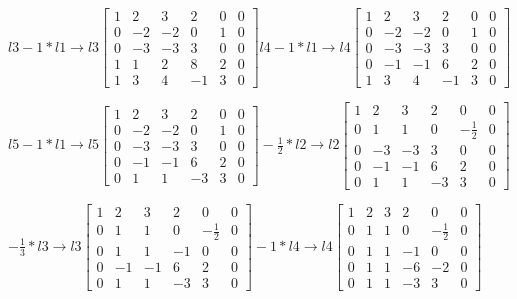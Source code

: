 \documentclass[10pt]{article}
\begin{document}
$l3 - 1 * l1 \rightarrow l3 \left[\begin{array}{ccccc|c}1 & 2 & 3 & 2 & 0 & 0 \\ 0 & -2 & -2 & 0 & 1 & 0 \\ 0 & -3 & -3 & 3 & 0 & 0 \\ 1 & 1 & 2 & 8 & 2 & 0 \\ 1 & 3 & 4 & -1 & 3 & 0\end{array}\right] l4 - 1 * l1 \rightarrow l4 \left[\begin{array}{ccccc|c}1 & 2 & 3 & 2 & 0 & 0 \\ 0 & -2 & -2 & 0 & 1 & 0 \\ 0 & -3 & -3 & 3 & 0 & 0 \\ 0 & -1 & -1 & 6 & 2 & 0 \\ 1 & 3 & 4 & -1 & 3 & 0\end{array}\right]$

$l5 - 1 * l1 \rightarrow l5 \left[\begin{array}{ccccc|c}1 & 2 & 3 & 2 & 0 & 0 \\ 0 & -2 & -2 & 0 & 1 & 0 \\ 0 & -3 & -3 & 3 & 0 & 0 \\ 0 & -1 & -1 & 6 & 2 & 0 \\ 0 & 1 & 1 & -3 & 3 & 0\end{array}\right] -\frac{1}{2} * l2 \rightarrow l2 \left[\begin{array}{ccccc|c}1 & 2 & 3 & 2 & 0 & 0 \\ 0 & 1 & 1 & 0 & -\frac{1}{2} & 0 \\ 0 & -3 & -3 & 3 & 0 & 0 \\ 0 & -1 & -1 & 6 & 2 & 0 \\ 0 & 1 & 1 & -3 & 3 & 0\end{array}\right]$

$-\frac{1}{3} * l3 \rightarrow l3 \left[\begin{array}{ccccc|c}1 & 2 & 3 & 2 & 0 & 0 \\ 0 & 1 & 1 & 0 & -\frac{1}{2} & 0 \\ 0 & 1 & 1 & -1 & 0 & 0 \\ 0 & -1 & -1 & 6 & 2 & 0 \\ 0 & 1 & 1 & -3 & 3 & 0\end{array}\right] -1 * l4 \rightarrow l4 \left[\begin{array}{ccccc|c}1 & 2 & 3 & 2 & 0 & 0 \\ 0 & 1 & 1 & 0 & -\frac{1}{2} & 0 \\ 0 & 1 & 1 & -1 & 0 & 0 \\ 0 & 1 & 1 & -6 & -2 & 0 \\ 0 & 1 & 1 & -3 & 3 & 0\end{array}\right]$
\end{document}
